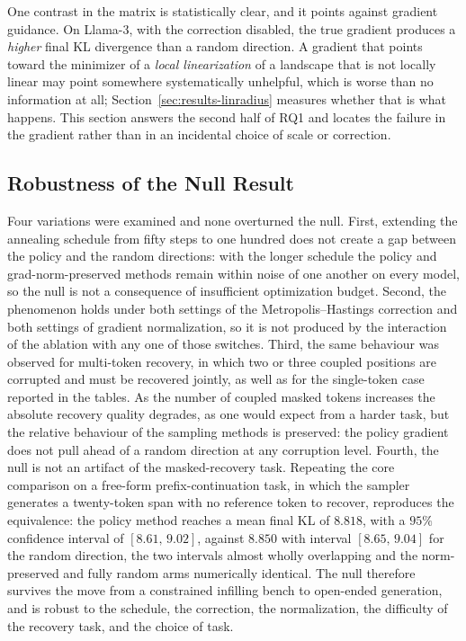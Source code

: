 One contrast in the matrix is statistically clear, and it points against gradient guidance. On Llama-3, with the correction disabled, the true gradient produces a \emph{higher} final KL divergence than a random direction. A gradient that points toward the minimizer of a \emph{local linearization} of a landscape that is not locally linear may point somewhere systematically unhelpful, which is worse than no information at all; Section~\ref{sec:results-linradius} measures whether that is what happens. This section answers the second half of RQ1 and locates the failure in the gradient rather than in an incidental choice of scale or correction.

\subsection{Robustness of the Null Result}
\label{sec:results-robust}

Four variations were examined and none overturned the null. First, extending the annealing schedule from fifty steps to one hundred does not create a gap between the policy and the random directions: with the longer schedule the policy and grad-norm-preserved methods remain within noise of one another on every model, so the null is not a consequence of insufficient optimization budget.
Second, the phenomenon holds under both settings of the Metropolis--Hastings correction and both settings of gradient normalization, so it is not produced by the interaction of the ablation with any one of those switches. Third, the same behaviour was observed for multi-token recovery, in which two or three coupled positions are corrupted and must be recovered jointly, as well as for the single-token case reported in the tables. As the number of coupled masked tokens increases the absolute recovery quality degrades, as one would expect from a harder task, but the relative behaviour of the sampling methods is preserved: the policy gradient does not pull ahead of a random direction at any corruption level. Fourth, the null is not an artifact of the masked-recovery task. Repeating the core comparison on a free-form prefix-continuation task, in which the sampler generates a twenty-token span with no reference token to recover, reproduces the equivalence: the policy method reaches a mean final KL of $8.818$, with a $95\%$ confidence interval of $[8.61,\, 9.02]$, against $8.850$ with interval $[8.65,\, 9.04]$ for the random direction, the two intervals almost wholly overlapping and the norm-preserved and fully random arms numerically identical.
The null therefore survives the move from a constrained infilling bench to open-ended generation, and is robust to the schedule, the correction, the normalization, the difficulty of the recovery task, and the choice of task.

